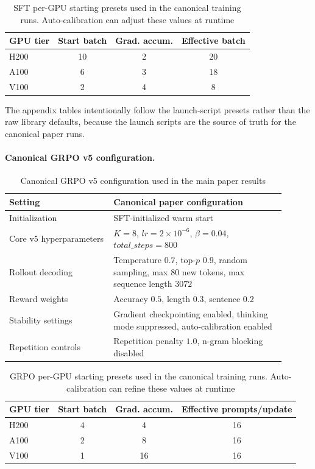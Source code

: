 \documentclass[11pt]{article}
\begin{document}
\begin{table}[H]
\centering
\caption{SFT per-GPU starting presets used in the canonical training runs. Auto-calibration can adjust these values at runtime}
\label{tab:appendix-sft-gpu}
\small
\begin{tabular}{lccc}
\toprule
GPU tier & Start batch & Grad. accum. & Effective batch \\
\midrule
H200 & 10 & 2 & 20 \\
A100 & 6 & 3 & 18 \\
V100 & 2 & 4 & 8 \\
\bottomrule
\end{tabular}
\end{table}

The appendix tables intentionally follow the launch-script presets rather than the raw library defaults, because the launch scripts are the source of truth for the canonical paper runs.

\paragraph{Canonical GRPO v5 configuration.}
\begin{table}[H]
\centering
\caption{Canonical GRPO v5 configuration used in the main paper results}
\label{tab:appendix-grpo-config}
\small
\begin{tabular}{L{0.34\linewidth}L{0.56\linewidth}}
\toprule
Setting & Canonical paper configuration \\
\midrule
Initialization & SFT-initialized warm start \\
Core v5 hyperparameters & $K = 8$, $\mathit{lr} = 2\times10^{-6}$, $\beta = 0.04$, $\mathit{total\_steps} = 800$ \\
Rollout decoding & Temperature $0.7$, top-$p$ $0.9$, random sampling, max $80$ new tokens, max sequence length $3072$ \\
Reward weights & Accuracy $0.5$, length $0.3$, sentence $0.2$ \\
Stability settings & Gradient checkpointing enabled, thinking mode suppressed, auto-calibration enabled \\
Repetition controls & Repetition penalty $1.0$, n-gram blocking disabled \\
\bottomrule
\end{tabular}
\end{table}

\begin{table}[H]
\centering
\caption{GRPO per-GPU starting presets used in the canonical training runs. Auto-calibration can refine these values at runtime}
\label{tab:appendix-grpo-gpu}
\small
\begin{tabular}{lccc}
\toprule
GPU tier & Start batch & Grad. accum. & Effective prompts/update \\
\midrule
H200 & 4 & 4 & 16 \\
A100 & 2 & 8 & 16 \\
V100 & 1 & 16 & 16 \\
\bottomrule
\end{tabular}
\end{table}
\end{document}
